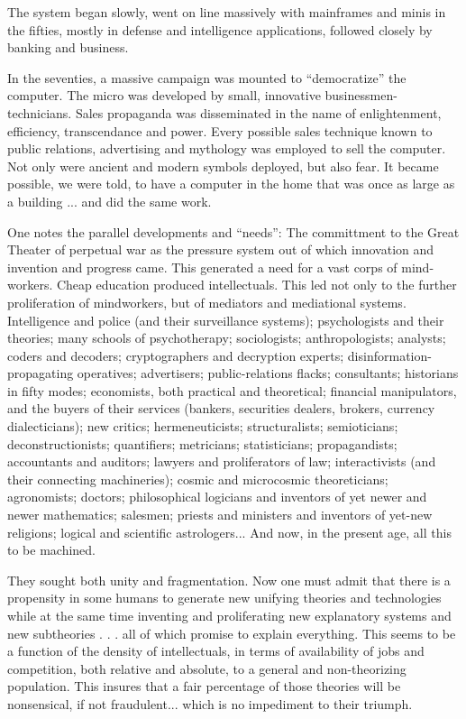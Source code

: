 \documentclass[11pt,twoside,draft]{memoir}
\begin{document}
The system began slowly, went on line
massively with mainframes and minis in the
fifties, mostly
in defense
and intelligence
applications, followed closely by banking
and business.

In the seventies, a massive campaign was
mounted to \enquote{democratize} the computer.
The micro was developed by small, innovative businessmen-technicians.
Sales propaganda was disseminated
in the name of enlightenment, efficiency, transcendance
and power. Every possible sales technique
known to public relations, advertising and
mythology was employed to sell the computer.
Not only were ancient and modern
symbols deployed, but also fear. It became
possible, we were told, to have a computer in
the home that was once as large as a building
... and did the same work.

One notes the parallel developments and
\enquote{needs}: The committment to the Great
Theater of perpetual war as the pressure
system out of which innovation and invention and progress came. This generated a
need for a vast corps of mind-workers. Cheap
education produced intellectuals. This led
not only to the further proliferation of mindworkers, but of mediators and mediational
systems. Intelligence and police (and their
surveillance systems); psychologists and
their theories; many schools of psychotherapy; sociologists; anthropologists; analysts;
coders and decoders; cryptographers and decryption experts; 
disinformation-propagating operatives; advertisers; public-relations
flacks; consultants; historians in fifty modes;
economists, both practical and theoretical;
financial manipulators, and the buyers of
their services (bankers, securities dealers,
brokers, currency dialecticians); new critics;
hermeneuticists; structuralists; semioticians;
deconstructionists; quantifiers; metricians;
statisticians; propagandists; accountants and
auditors; lawyers and proliferators of law;
interactivists (and their connecting machineries); cosmic and microcosmic theoreticians;
agronomists; doctors; philosophical logicians
and inventors of yet newer and newer mathematics; salesmen; priests and ministers and
inventors of yet-new religions; logical and
scientific astrologers... And now, in the
present age, all this to be machined.

They sought both unity and fragmentation. Now one must admit that there is a
propensity in some humans to generate new
unifying theories and technologies while
at the same time inventing and proliferating new explanatory systems and new subtheories . . . all of which promise to explain
everything. This seems to be a function of
the density of intellectuals, in terms of availability of jobs and competition, both relative
and absolute, to a general and non-theorizing
population. This insures that a fair percentage of those theories will be nonsensical, if
not fraudulent... which is no impediment to
their triumph.
\end{document}
